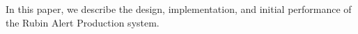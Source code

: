 In this paper, we describe the design, implementation, and initial performance of the Rubin Alert Production system.


